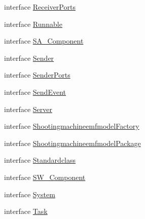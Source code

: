 \begin{DoxyCompactItemize}
\item 
interface \hyperlink{interfaceshootingmachineemfmodel_1_1_receiver_ports}{Receiver\-Ports}
\item 
interface \hyperlink{interfaceshootingmachineemfmodel_1_1_runnable}{Runnable}
\item 
interface \hyperlink{interfaceshootingmachineemfmodel_1_1_s_a___component}{S\-A\-\_\-\-Component}
\item 
interface \hyperlink{interfaceshootingmachineemfmodel_1_1_sender}{Sender}
\item 
interface \hyperlink{interfaceshootingmachineemfmodel_1_1_sender_ports}{Sender\-Ports}
\item 
interface \hyperlink{interfaceshootingmachineemfmodel_1_1_send_event}{Send\-Event}
\item 
interface \hyperlink{interfaceshootingmachineemfmodel_1_1_server}{Server}
\item 
interface \hyperlink{interfaceshootingmachineemfmodel_1_1_shootingmachineemfmodel_factory}{Shootingmachineemfmodel\-Factory}
\item 
interface \hyperlink{interfaceshootingmachineemfmodel_1_1_shootingmachineemfmodel_package}{Shootingmachineemfmodel\-Package}
\item 
interface \hyperlink{interfaceshootingmachineemfmodel_1_1_standardclass}{Standardclass}
\item 
interface \hyperlink{interfaceshootingmachineemfmodel_1_1_s_w___component}{S\-W\-\_\-\-Component}
\item 
interface \hyperlink{interfaceshootingmachineemfmodel_1_1_system}{System}
\item 
interface \hyperlink{interfaceshootingmachineemfmodel_1_1_task}{Task}
\end{DoxyCompactItemize}
